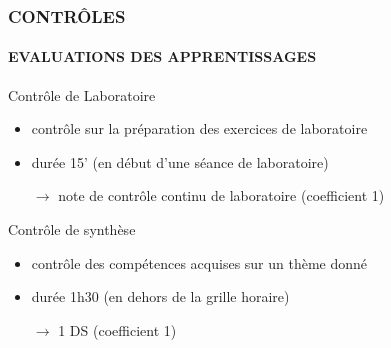 \begin{frame}
\frametitle{\uppercase{Contrôles}}
\framesubtitle{\uppercase{Evaluations des apprentissages}}
\begin{block}{Contrôle de Laboratoire}
	\begin{itemize}
	\item contrôle sur la préparation des exercices de laboratoire
	\item durée 15' (en début d'une séance de laboratoire)
	\item[$\rightarrow$] \alert{note de contrôle continu de laboratoire  (coefficient 1)}
	\end{itemize}
\end{block}

\begin{block}{Contrôle de synthèse}
	\begin{itemize}
	\item contrôle des compétences acquises sur un thème donné
	\item durée 1h30 (en dehors de la grille horaire)
	\item[$\rightarrow$] \alert{1 DS (coefficient 1)}
	\end{itemize}
\end{block}

\end{frame}
